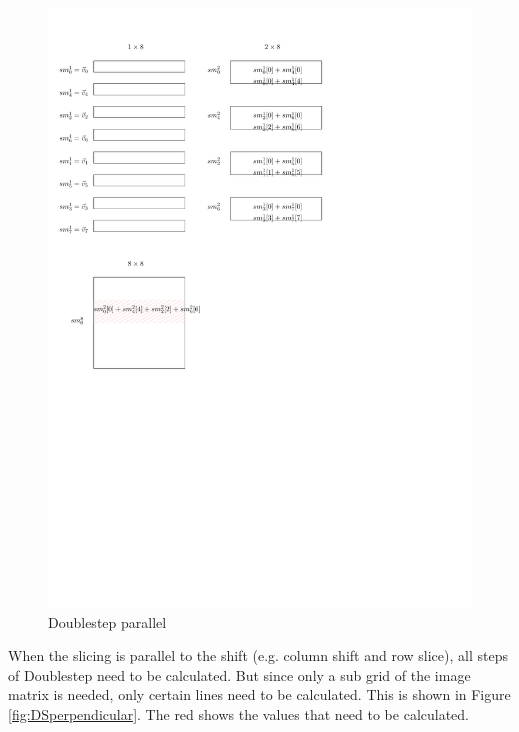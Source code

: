 \documentclass[12pt]{article}
\begin{document}
\begin{figure}
\includegraphics[scale=0.7]{Doublestep_parallel}
\caption{Doublestep parallel}
\label{fig:DSparallel}
\end{figure}

When the slicing is parallel to the shift (e.g. column shift and row slice), all steps of Doublestep need to be calculated. But since only a sub grid of the image matrix is needed, only certain lines need to be calculated. This is shown in Figure \ref{fig:DSperpendicular}. The red shows the values that need to be calculated.
\end{document}
